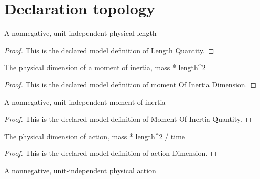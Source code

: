 \section{Declaration topology}
\begin{definition}
  \label{def:physics:phyx-mini-0628:phyxminiproblems-problemphyxmini0628-lengthquantity}
  A nonnegative, unit-independent physical length
\end{definition}
\begin{proof}
  This is the declared model definition of Length Quantity.
\end{proof}
\begin{definition}
  \label{def:physics:phyx-mini-0628:phyxminiproblems-problemphyxmini0628-momentofinertiadimension}
  The physical dimension of a moment of inertia, mass * length\textasciicircum{}2
\end{definition}
\begin{proof}
  This is the declared model definition of moment Of Inertia Dimension.
\end{proof}
\begin{definition}
  \label{def:physics:phyx-mini-0628:phyxminiproblems-problemphyxmini0628-momentofinertiaquantity}
  A nonnegative, unit-independent moment of inertia
\end{definition}
\begin{proof}
  This is the declared model definition of Moment Of Inertia Quantity.
\end{proof}
\begin{definition}
  \label{def:physics:phyx-mini-0628:phyxminiproblems-problemphyxmini0628-actiondimension}
  The physical dimension of action, mass * length\textasciicircum{}2 / time
\end{definition}
\begin{proof}
  This is the declared model definition of action Dimension.
\end{proof}
\begin{definition}
  \label{def:physics:phyx-mini-0628:phyxminiproblems-problemphyxmini0628-actionquantity}
  A nonnegative, unit-independent physical action
\end{definition}
